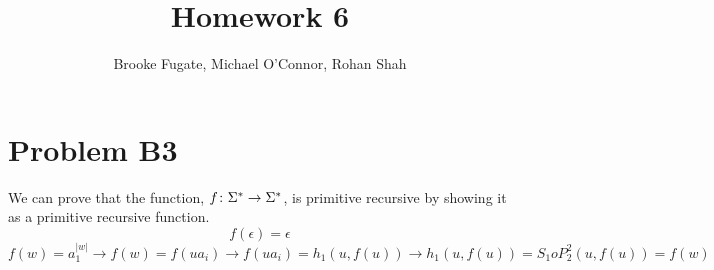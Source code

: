 \documentclass[12pt]{article}
\begin{document}
\pagestyle{plain}
\titleformat{\subsection}[runin]
  {\normalfont\large\bfseries}{\thesubsection}{1em}{}
\titleformat{\subsubsection}[runin]
  {\bfseries}{}{1em}{}

\title{Homework 6}
\author{Brooke Fugate, Michael O'Connor, Rohan Shah}
\date{}

\maketitle

\section*{Problem B3}
We can prove that the function, $f\colon \Sigma^*\rightarrow \Sigma^*$, is primitive recursive by showing it as a primitive recursive function. \newline
$$f(\epsilon) = \epsilon $$
$$f(w) = a_1^{|w|} \rightarrow f(w) = f(ua_i) \rightarrow f(ua_i) = h_1(u, f(u)) \rightarrow h_1(u, f(u))= S_1 o P^2_2(u, f(u)) = f(w)$$
\end{document}

